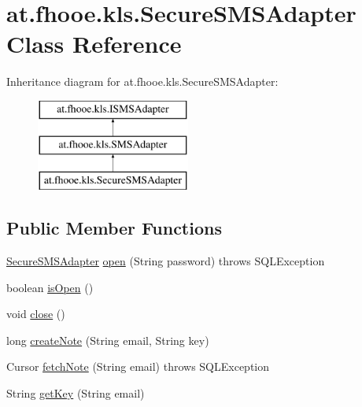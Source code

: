 \hypertarget{classat_1_1fhooe_1_1kls_1_1_secure_s_m_s_adapter}{\section{at.\-fhooe.\-kls.\-Secure\-S\-M\-S\-Adapter Class Reference}
\label{classat_1_1fhooe_1_1kls_1_1_secure_s_m_s_adapter}
}
Inheritance diagram for at.\-fhooe.\-kls.\-Secure\-S\-M\-S\-Adapter\-:\begin{figure}[H]
\begin{center}
\leavevmode
\includegraphics[height=3.000000cm]{classat_1_1fhooe_1_1kls_1_1_secure_s_m_s_adapter}
\end{center}
\end{figure}
\subsection*{Public Member Functions}
\begin{DoxyCompactItemize}
\item 
\hyperlink{classat_1_1fhooe_1_1kls_1_1_secure_s_m_s_adapter}{Secure\-S\-M\-S\-Adapter} \hyperlink{classat_1_1fhooe_1_1kls_1_1_secure_s_m_s_adapter_a2440ce7acceadd844be860e6f3abc726}{open} (String password)  throws S\-Q\-L\-Exception 
\item 
boolean \hyperlink{classat_1_1fhooe_1_1kls_1_1_secure_s_m_s_adapter_a3a5818f550316111f5997cbd319b79e0}{is\-Open} ()
\item 
void \hyperlink{classat_1_1fhooe_1_1kls_1_1_secure_s_m_s_adapter_a24e26b930062d82381b907a2fb997371}{close} ()
\item 
long \hyperlink{classat_1_1fhooe_1_1kls_1_1_secure_s_m_s_adapter_a247ac1ceae4179521836ec79957cf160}{create\-Note} (String email, String key)
\item 
Cursor \hyperlink{classat_1_1fhooe_1_1kls_1_1_secure_s_m_s_adapter_ae88bc7113d7d7b8e6b09880a0da09124}{fetch\-Note} (String email)  throws S\-Q\-L\-Exception 
\item 
String \hyperlink{classat_1_1fhooe_1_1kls_1_1_secure_s_m_s_adapter_a38cbfa4e2a84517ef6ba79d0a0cf0bea}{get\-Key} (String email)
\end{DoxyCompactItemize}
